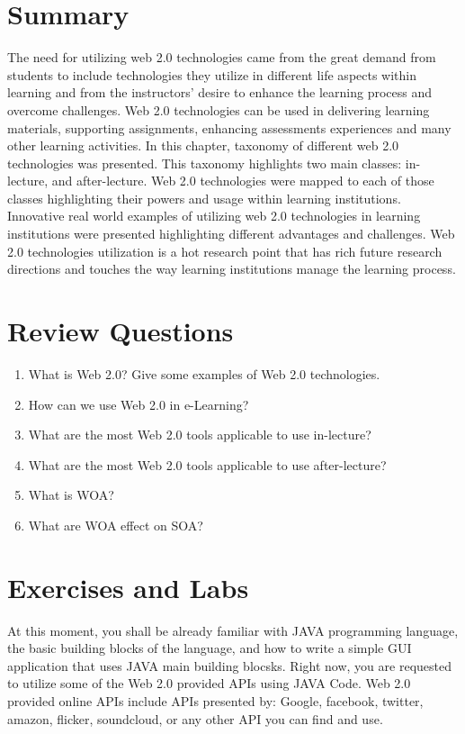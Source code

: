 \documentclass[12pt,a4paper,final,twoside,onecolumn,titlepage]{book}
\begin{document}
\section{Summary}
The need for utilizing web 2.0 technologies came from the great demand from students to include technologies they utilize in different life aspects within learning and from the instructors’ desire to enhance the learning process and overcome challenges. Web 2.0 technologies can be used in delivering learning materials, supporting assignments, enhancing assessments experiences and many other learning activities. In this chapter, taxonomy of different web 2.0 technologies was presented. This taxonomy highlights two main classes: in-lecture, and after-lecture. Web 2.0 technologies were mapped to each of those classes highlighting their powers and usage within learning institutions. Innovative real world examples of utilizing web 2.0 technologies in learning institutions were presented highlighting different advantages and challenges. Web 2.0 technologies utilization is a hot research point that has rich future research directions and touches the way learning institutions manage the learning process.

\section{Review Questions}
\begin{enumerate}
\item What is Web 2.0? Give some examples of Web 2.0 technologies.
\item How can we use Web 2.0 in e-Learning?
\item What are the most Web 2.0 tools applicable to use in-lecture?
\item What are the most Web 2.0 tools applicable to use after-lecture?
\item What is \gls{WOA}?
\item What are \gls{WOA} effect on \gls{SOA}?
\end{enumerate}

\section{Exercises and Labs}
At this moment, you shall be already familiar with JAVA programming language, the basic building blocks of the language, and how to write a simple GUI application that uses JAVA main building blocsks. Right now, you are requested to utilize some of the Web 2.0 provided APIs using JAVA Code. Web 2.0 provided online APIs include APIs presented by: Google, facebook, twitter, amazon, flicker, soundcloud, or any other API you can find and use.
\end{document}

